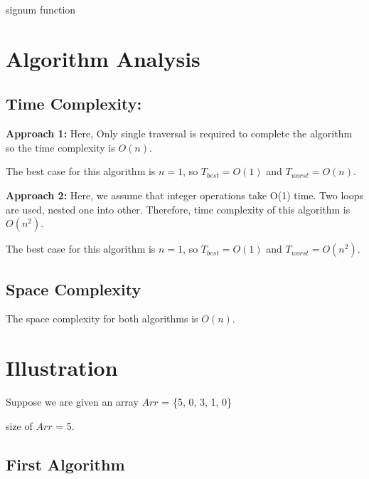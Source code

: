 \documentclass[conference]{IEEEtran}
\begin{document}
\begin{algorithm}

    \caption{signum function}
    
    \DontPrintSemicolon

    
\end{algorithm}

\section{Algorithm Analysis}
\subsection{Time Complexity:}

\textbf{Approach 1:} 
Here, Only single traversal is required to complete the algorithm so the time complexity is $O(n)$.

The best case for this algorithm is $n=1$, so $T_{best}=O(1)$ and $T_{worst}=O(n)$.

\textbf{Approach 2:} 
Here, we assume that integer operations take O(1) time. Two loops are used, nested one into other. Therefore, time complexity of this algorithm is $O(n^2)$.

The best case for this algorithm is $n=1$, so $T_{best}=O(1)$ and $T_{worst}=O(n^2)$.



\subsection{Space Complexity}
The space complexity for both algorithms is $O(n)$.

\section{Illustration}

Suppose we are given an array $Arr$ = \{5, 0, 3, 1, 0\}

size of $Arr$ = 5.
\subsection{First Algorithm}
\end{document}
